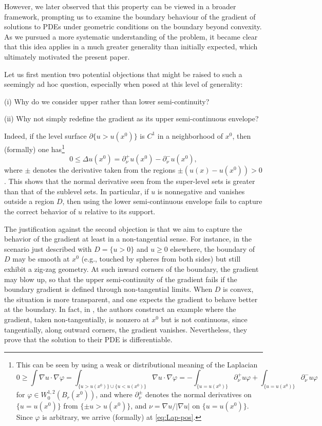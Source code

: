 \documentclass[11pt,reqno]{amsart}
\theoremstyle{plain}
\theoremstyle{remark}
\numberwithin{equation}{section}
\begin{document}
However, we later observed that this property can be viewed in a broader framework, prompting us to examine the boundary behaviour of the gradient of solutions to PDEs under geometric conditions on the boundary beyond convexity. As we pursued a more systematic understanding of the problem, it became clear that this idea  applies in a much greater generality than initially expected, which ultimately motivated the present paper.

Let us first mention two potential objections that might be raised to such a seemingly ad hoc question, especially when posed at this level of generality:

\medskip 

(i) Why do we consider upper rather than lower semi-continuity?


(ii) Why not simply redefine the gradient as its upper semi-continuous envelope?

\medskip



Indeed, if   the level surface $\partial\{u > u(x^0)\}$ is $C^1$ in a neighborhood of $x^0$, then (formally) one has\footnote{This can be seen by using a weak or distributional meaning of the Laplacian 
$$
0 \geq  \int \nabla u \cdot \nabla \varphi  = 
\int_{\{u  > u(x^0)\} \cup \{u  < u(x^0)\} } \nabla u \cdot \nabla \varphi =
- \int_{ \{ u = u(x^0)\}} \partial^+_\nu u \varphi + \int_{\{ u = u(x^0)\}} \partial^-_\nu u \varphi 
$$ 
for $\varphi \in W_0^{1,2} (B_r(x^0) )$, and where $\partial^\pm_\nu$ denotes the normal derivatives on $\{ u= u(x^0)\}$ from $\{\pm u > u(x^0)\}$, and  $\nu = \nabla u /|\nabla u|$ on $\{ u = u(x^0)\}$.  Since $\varphi$ is arbitrary, we arrive (formally)  at \eqref{eq:Lap-pos}.
}
\begin{equation}\label{eq:Lap-pos}
    0 \leq \Delta u (x^0) = \partial^+_\nu u(x^0) - \partial^-_\nu u(x^0),
\end{equation}
where $\pm$ denotes the derivative taken from the regions ${\pm (u(x) - u(x^0)) > 0}$. This shows that the normal derivative seen from the super-level sets is greater than that of  the sublevel sets. In particular, if $u$ is nonnegative and vanishes outside a region $D$, then using the lower semi-continuous envelope fails to capture the correct behavior of $u$ relative to its support.


The justification against  the second objection is that we aim to capture the behavior of the gradient at least in a non-tangential sense. For instance, in the scenario just described with $D = \{u > 0\}$ and $u \geq 0$ elsewhere, the boundary of $D$ may be smooth at $x^0$ (e.g., touched by spheres from both sides) but still exhibit a zig-zag geometry. At such inward corners of the boundary, the gradient may blow up, so that the upper semi-continuity of the gradient fails if the boundary gradient is defined through non-tangential limits.
When $D$ is convex, the situation is more transparent, and one expects the gradient to behave better at the boundary. In fact, in \cite{LW2006}, the authors  construct an example where the gradient, taken non-tangentially, is nonzero at $x^0$ but is not continuous, since  tangentially, along outward corners, the gradient vanishes. Nevertheless, they prove that the solution to their PDE is differentiable. 
\end{document}
